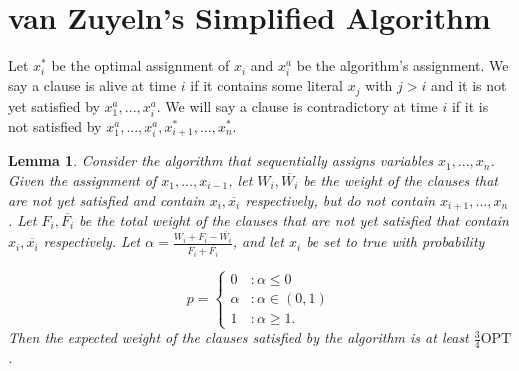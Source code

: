 \documentclass[11pt,letter]{article}
\newtheorem{lemma}[theorem]{Lemma}
\numberwithin{theorem}{section}
\begin{document}
\section{van Zuyeln's Simplified Algorithm}\label{S:vZ}

Let $x_i^*$ be the optimal assignment of $x_i$ and $x_i^{a}$
be the algorithm's assignment. We say a clause is alive
at time $i$ if it contains some literal $x_j$ with $j > i$ and it is not yet satisfied by $x_1^a,...,x_i^a$.
We will say a clause is contradictory at time $i$ if it is not satisfied by $x_1^a,...,x_i^a,x_{i+1}^*,...,x_n^*$.


\begin{lemma}
Consider the algorithm that sequentially assigns variables $x_1,...,x_n$. Given the assignment of $x_1,...,x_{i-1}$,
 let $W_i, \overline{W_i}$ be the weight of the clauses that are not yet satisfied and contain $x_i, \overline{x_i}$ respectively,
 but do not contain $x_{i+1}, ..., x_n$. Let $F_i, \overline{F_i}$ be the total weight of the clauses that are not yet satisfied
 that contain $x_i, \overline{x_i}$ respectively. Let $\alpha = \frac{W_i + F_i - \overline{W_i}}{F_i + \overline{F_i}}$, and let $x_i$ be set to true with probability

\begin{displaymath}
  p = \left\{
     \begin{array}{lr}
       0 & : \alpha \leq 0\\
       \alpha & : \alpha \in (0,1) \\
       1 & : \alpha \geq 1.
     \end{array}
   \right.
\end{displaymath}
Then the expected weight of the clauses satisfied by the algorithm is at least $\frac{3}{4} \textrm{OPT}$.
\end{lemma}
\end{document}
